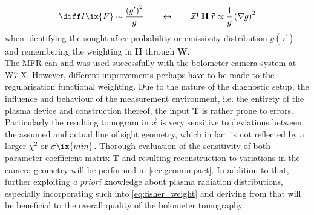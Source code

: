 %
        \begin{align}%
            \diff I\ix{F}\sim\frac{\left(g^{\prime}\right)^{2}}{g}\qquad\leftrightarrow\qquad\vec{x}^{\intercal}\,\mathbf{H}\,\vec{x}\propto\frac{1}{g}\left(\nabla g\right)^{2}\nonumber%
        \end{align}%
%
        when identifying the sought after probability or emissivity distribution $g\left(\vec{r}\right)$ and remembering the weighting in $\mathbf{H}$ through $\mathbf{W}$.\\%
        The MFR can and was used successfully with the bolometer camera system at W7-X. However, different improvements perhaps have to be made to the regularisation functional weighting. Due to the nature of the diagnostic setup, the influence and behaviour of the measurement environment, i.e. the entirety of the plasma device and construction thereof, the input $\mathbf{T}$ is rather prone to errors. Particularly the resulting tomogram in $\vec{x}$ is very sensitive to deviations between the assumed and actual line of sight geometry, which in fact is not reflected by a larger $\chi^{2}$ or $\sigma\ix{min}$. Thorough evaluation of the sensitivity of both parameter coefficient matrix $\mathbf{T}$ and resulting reconstruction to variations in the camera geometry will be performed in \cref{sec:geomimpact}. In addition to that, further exploiting \textit{a priori} knowledge about plasma radiation distributions, especially incorporating such into \cref{eq:fisher_weight} and deriving from that will be beneficial to the overall quality of the bolometer tomography.%
%
